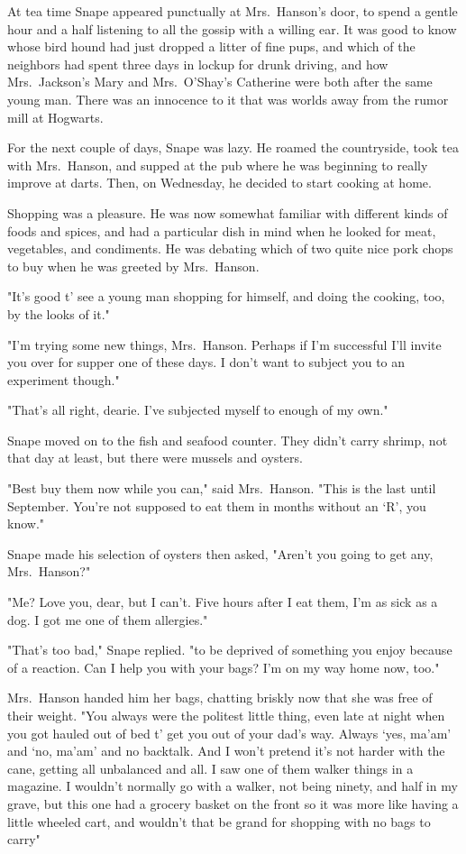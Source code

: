 At tea time Snape appeared punctually at Mrs.~Hanson's door, to spend a gentle hour and a half listening to all the gossip with a willing ear. It was good to know whose bird hound had just dropped a litter of fine pups, and which of the neighbors had spent three days in lockup for drunk driving, and how Mrs.~Jackson's Mary and Mrs.~O'Shay's Catherine were both after the same young man. There was an innocence to it that was worlds away from the rumor mill at Hogwarts.

For the next couple of days, Snape was lazy. He roamed the countryside, took tea with Mrs.~Hanson, and supped at the pub where he was beginning to really improve at darts. Then, on Wednesday, he decided to start cooking at home.

Shopping was a pleasure. He was now somewhat familiar with different kinds of foods and spices, and had a particular dish in mind when he looked for meat, vegetables, and condiments. He was debating which of two quite nice pork chops to buy when he was greeted by Mrs.~Hanson.

"It's good t' see a young man shopping for himself, and doing the cooking, too, by the looks of it."

"I'm trying some new things, Mrs.~Hanson. Perhaps if I'm successful I'll invite you over for supper one of these days. I don't want to subject you to an experiment though."

"That's all right, dearie. I've subjected myself to enough of my own."

Snape moved on to the fish and seafood counter. They didn't carry shrimp, not that day at least, but there were mussels and oysters.

"Best buy them now while you can," said Mrs.~Hanson. "This is the last until September. You're not supposed to eat them in months without an `R', you know."

Snape made his selection of oysters then asked, "Aren't you going to get any, Mrs.~Hanson?"

"Me? Love you, dear, but I can't. Five hours after I eat them, I'm as sick as a dog. I got me one of them allergies."

"That's too bad," Snape replied. "to be deprived of something you enjoy because of a reaction. Can I help you with your bags? I'm on my way home now, too."

Mrs.~Hanson handed him her bags, chatting briskly now that she was free of their weight. "You always were the politest little thing, even late at night when you got hauled out of bed t' get you out of your dad's way. Always `yes, ma'am' and `no, ma'am' and no backtalk. And I won't pretend it's not harder with the cane, getting all unbalanced and all. I saw one of them walker things in a magazine. I wouldn't normally go with a walker, not being ninety, and half in my grave, but this one had a grocery basket on the front so it was more like having a little wheeled cart, and wouldn't that be grand for shopping with no bags to carry{\el}"

